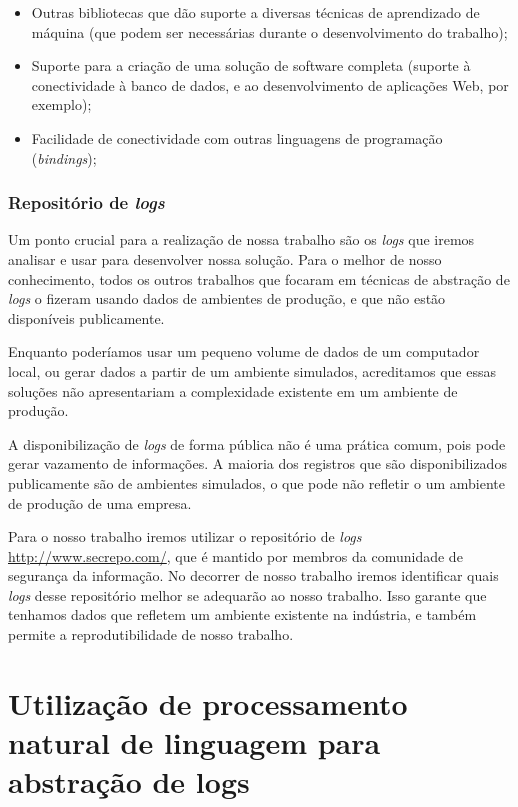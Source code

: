 \documentclass[
	12pt,				%
	openright,			%
	twoside,			%
	a4paper,			%
	english,			%
	spanish,			%
	brazil,				%
	]{abntex2}
\begin{document}
\begin{itemize}
	\item Outras bibliotecas que dão suporte a diversas técnicas de aprendizado de máquina (que podem ser necessárias durante o desenvolvimento do trabalho);
	\item Suporte para a criação de uma solução de software completa (suporte à conectividade à banco de dados, e ao desenvolvimento de aplicações Web, por exemplo);
	\item Facilidade de conectividade com outras linguagens de programação (\emph{bindings});
\end{itemize}

\subsection{Repositório de \emph{logs}}

Um ponto crucial para a realização de nossa trabalho são os \emph{logs} que iremos analisar e usar para desenvolver nossa solução. Para o melhor de nosso conhecimento, todos os outros trabalhos que focaram em técnicas de abstração de \emph{logs} o fizeram usando dados de ambientes de produção, e que não estão disponíveis publicamente.

Enquanto poderíamos usar um pequeno volume de dados de um computador local, ou gerar dados a partir de um ambiente simulados, acreditamos que essas soluções não apresentariam a complexidade existente em um ambiente de produção.

A disponibilização de \emph{logs} de forma pública não é uma prática comum, pois pode gerar vazamento de informações. A maioria dos registros que são disponibilizados publicamente são de ambientes simulados, o que pode não refletir o um ambiente de produção de uma empresa.

Para o nosso trabalho iremos utilizar o repositório de \emph{logs} \url{http://www.secrepo.com/}, que é mantido por membros da comunidade de segurança da informação. No decorrer de nosso trabalho iremos identificar quais \emph{logs} desse repositório melhor se adequarão ao nosso trabalho. Isso garante que tenhamos dados que refletem um ambiente existente na indústria, e também permite a reprodutibilidade de nosso trabalho.

\chapter{Utilização de processamento natural de linguagem para abstração de logs}\label{chap:proposta}
\end{document}
